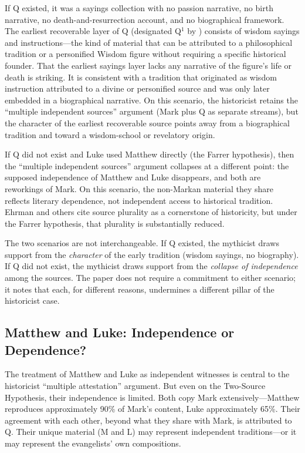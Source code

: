 \documentclass[12pt,oneside]{article}
\begin{document}
If Q existed, it was a sayings collection with no passion narrative, no
birth narrative, no death-and-resurrection account, and no biographical
framework.  The earliest recoverable layer of Q (designated Q$^1$ by
\citealt{Kloppenborg1987}) consists of wisdom sayings and
instructions---the kind of material that can be attributed to a
philosophical tradition or a personified Wisdom figure without requiring
a specific historical founder.  That the earliest sayings layer lacks
any narrative of the figure's life or death is striking.  It is
consistent with a tradition that originated as wisdom instruction
attributed to a divine or personified source and was only later embedded
in a biographical narrative.  On this scenario, the historicist retains
the ``multiple independent sources'' argument (Mark plus Q as separate
streams), but the character of the earliest recoverable source points
away from a biographical tradition and toward a wisdom-school or
revelatory origin.

If Q did not exist and Luke used Matthew directly (the Farrer
hypothesis), then the ``multiple independent sources'' argument
collapses at a different point: the supposed independence of Matthew and
Luke disappears, and both are reworkings of Mark.  On this scenario,
the non-Markan material they share reflects literary dependence, not
independent access to historical tradition.  Ehrman and others
\citep{Ehrman2012} cite source plurality as a cornerstone of
historicity, but under the Farrer hypothesis, that plurality is
substantially reduced.

The two scenarios are not interchangeable.  If Q existed, the mythicist
draws support from the \textit{character} of the early tradition (wisdom
sayings, no biography).  If Q did not exist, the mythicist draws
support from the \textit{collapse of independence} among the sources.
The paper does not require a commitment to either scenario; it notes
that each, for different reasons, undermines a different pillar of the
historicist case.

\subsection{Matthew and Luke: Independence or Dependence?}
\label{sec:gospels:synoptic}

The treatment of Matthew and Luke as independent witnesses is central
to the historicist ``multiple attestation'' argument.  But even on the
Two-Source Hypothesis, their independence is limited.  Both copy Mark
extensively---Matthew reproduces approximately 90\% of Mark's content,
Luke approximately 65\%.  Their agreement with each other, beyond what
they share with Mark, is attributed to Q.  Their unique material (M and
L) may represent independent traditions---or it may represent the
evangelists' own compositions.
\end{document}
